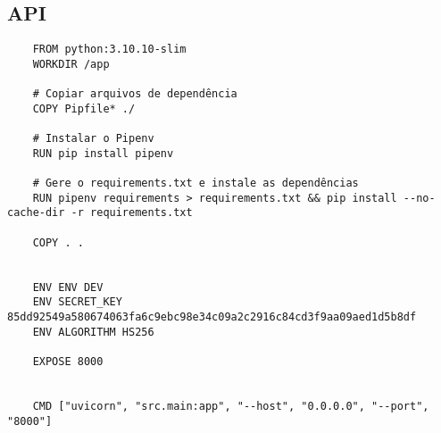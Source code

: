 \subsection{API}\label{apiDockerfile}
\begin{Verbatim}
    FROM python:3.10.10-slim
    WORKDIR /app
    
    # Copiar arquivos de dependência
    COPY Pipfile* ./
    
    # Instalar o Pipenv
    RUN pip install pipenv
    
    # Gere o requirements.txt e instale as dependências
    RUN pipenv requirements > requirements.txt && pip install --no-cache-dir -r requirements.txt
    
    COPY . .
    
    
    ENV ENV DEV
    ENV SECRET_KEY 85dd92549a580674063fa6c9ebc98e34c09a2c2916c84cd3f9aa09aed1d5b8df
    ENV ALGORITHM HS256
    
    EXPOSE 8000
    
    
    CMD ["uvicorn", "src.main:app", "--host", "0.0.0.0", "--port", "8000"]
    
\end{Verbatim}

